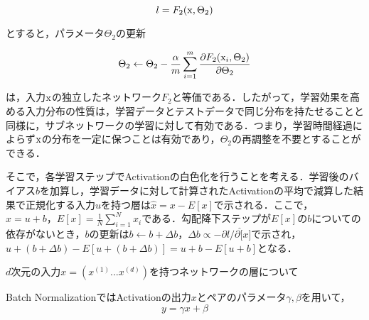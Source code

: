 \begin{equation}
	l = F_2({\rm x}, \Theta_2)
\end{equation}

とすると，パラメータ$\Theta_2$の更新

\begin{equation}
	\Theta_2 \leftarrow \Theta_2 - \frac{\alpha}{m}\sum_{i=1}^{m}\frac{\partial F_2({\rm x}_i, \Theta_2)}{\partial \Theta_2}
\end{equation}

は，入力${\rm x}$の独立したネットワーク$F_2$と等価である．したがって，学習効果を高める入力分布の性質は，学習データとテストデータで同じ分布を持たせることと同様に，サブネットワークの学習に対して有効である．つまり，学習時間経過によらず${\rm x}$の分布を一定に保つことは有効であり，$\Theta_2$の再調整を不要とすることができる．

そこで，各学習ステップでActivationの白色化を行うことを考える．学習後のバイアス$b$を加算し，学習データに対して計算されたActivationの平均で減算した結果で正規化する入力$u$を持つ層は$\hat{x}=x-E[x]$で示される．ここで，$x=u+b，E[x]=\frac{1}{N}\sum_{i=1}^{N}x_i$である．勾配降下ステップが$E[x]$の$b$についての依存がないとき，$b$の更新は$b \leftarrow b+\Delta b$，$\Delta b \propto -\partial l / \partial \hat[x]$で示され，$u+(b+\Delta b)-E[u+(b+\Delta b)]=u+b-E[u+b]$となる．

$d$次元の入力$x=(x^(1) ... x^(d))$を持つネットワークの層について


Batch NormalizationではActivationの出力$x$とペアのパラメータ$\gamma, \beta$を用いて，
\begin{equation}
	y = \gamma x + \beta
\end{equation}
